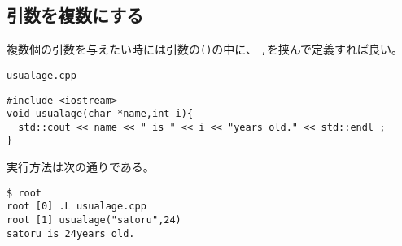   \subsection{引数を複数にする}
  複数個の引数を与えたい時には引数の\verb|()|の中に、
  \verb|,|を挟んで定義すれば良い。
  \begin{itembox}{\texttt{usualage.cpp}}
\begin{verbatim}
#include <iostream>
void usualage(char *name,int i){
  std::cout << name << " is " << i << "years old." << std::endl ;
}
\end{verbatim}
  \end{itembox}
実行方法は次の通りである。
\begin{verbatim}
$ root
root [0] .L usualage.cpp 
root [1] usualage("satoru",24)
satoru is 24years old.
\end{verbatim}